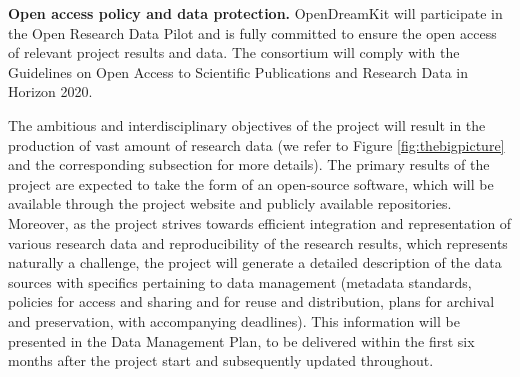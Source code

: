 
%
%
%
%
%
%
%
%

{\bf Open access policy and data protection.} OpenDreamKit will participate in the Open Research Data Pilot and is fully committed to ensure the open access of relevant project results and data. The consortium will comply with the Guidelines on Open Access to Scientific Publications and Research Data in Horizon 2020. 

The ambitious and interdisciplinary objectives of the project will result in the production of vast amount of research data (we refer to Figure \ref{fig:thebigpicture} and the corresponding subsection for more details). The primary results of the project are expected to take the form of an open-source software, which will be available through the project website and publicly available repositories. Moreover, as the project strives towards efficient integration and representation of various research data and reproducibility of the research results, which represents naturally a challenge, the project will generate a detailed description of the data sources with specifics pertaining to data management (metadata standards, policies for access and sharing and for reuse and distribution, plans for archival and preservation, with accompanying deadlines). This information will be presented in the Data Management Plan, to be delivered within the first six months after the project start and subsequently updated throughout. 

